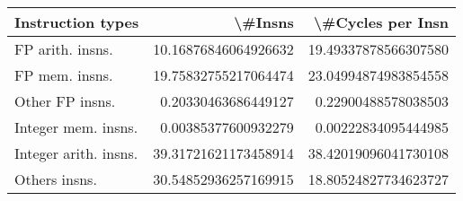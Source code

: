 \begin{tabular}{lrr}
\toprule
     Instruction types &               \textbackslash \#Insns &     \textbackslash \#Cycles per Insn \\
\midrule
      FP arith. insns. &  10.16876846064926632 &  19.49337878566307580 \\
        FP mem. insns. &  19.75832755217064474 &  23.04994874983854558 \\
       Other FP insns. &   0.20330463686449127 &   0.22900488578038503 \\
   Integer mem. insns. &   0.00385377600932279 &   0.00222834095444985 \\
 Integer arith. insns. &  39.31721621173458914 &  38.42019096041730108 \\
         Others insns. &  30.54852936257169915 &  18.80524827734623727 \\
\bottomrule
\end{tabular}
